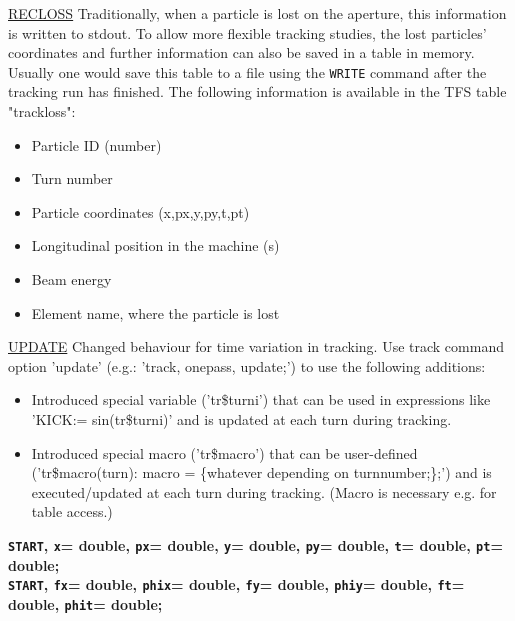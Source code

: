 \begin{description}
\begin{itemize}
          \end{itemize}
          
          \href{track:remarks:recloss:notes}{RECLOSS}
          Traditionally, when a particle is lost on the aperture, this information is written to stdout. To allow more flexible 
          tracking studies, the lost particles' coordinates and further information can also be saved in a table in memory. 
          Usually one would save this table to a file using the \texttt{WRITE} command after the tracking run has finished.
          The following information is available in the TFS table "trackloss":
          
          \begin{itemize}
	  \item Particle ID (number)
	  \item Turn number
	  \item Particle coordinates (x,px,y,py,t,pt)
	  \item Longitudinal position in the machine (s)
	  \item Beam energy
	  \item Element name, where the particle is lost
          \end{itemize}
          
          \href{track:remarks:update:notes}{UPDATE}
          Changed behaviour for time variation in tracking. Use
          track command option 'update' (e.g.: 'track, onepass,
          update;') to use the following additions: 
          
          \begin{itemize}
	  \item  Introduced special variable ('tr\$turni') that can be
            used in expressions like 'KICK:= sin(tr\$turni)' and is updated at each turn during tracking.
            
	  \item  Introduced special macro ('tr\$macro') that can be
            user-defined ('tr\$macro(turn): macro = \{whatever
            depending on turnnumber;\};') and is executed/updated at each turn during tracking.
            (Macro is necessary e.g. for table access.)
            
          \end{itemize}
          
	\item{\textbf{\texttt{START}, \texttt{x}= double, \texttt{px}= double, \texttt{y}= double, \texttt{py}= double, \texttt{t}= double, \texttt{pt}= double;}
          \\\textbf{\texttt{START}, \texttt{fx}= double, \texttt{phix}= double, \texttt{fy}= double, \texttt{phiy}= double, \texttt{ft}= double, \texttt{phit}= double;}} 
          

\end{description}
